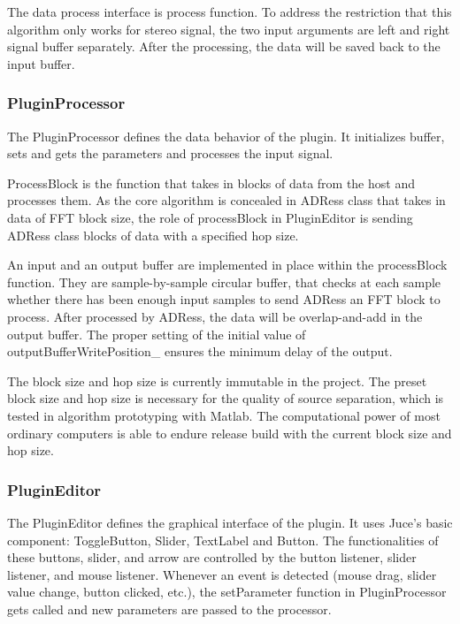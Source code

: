 \documentclass{sig-alternate}
\begin{document}
The data process interface is process function. To address the restriction that this algorithm only works for stereo signal, the two input arguments are left and right signal buffer separately. After the processing, the data will be saved back to the input buffer.

\subsubsection{PluginProcessor}

The PluginProcessor defines the data behavior of the plugin. It initializes buffer, sets and gets the parameters and processes the input signal. 
     
ProcessBlock is the function that takes in blocks of data from the host and processes them. As the core algorithm is concealed in ADRess class that takes in data of FFT block size, the role of processBlock in PluginEditor is sending ADRess class blocks of data with a specified hop size.
     
An input and an output buffer are implemented in place within the processBlock function. They are sample-by-sample circular buffer, that checks at each sample whether there has been enough input samples to send ADRess an FFT block to process. After processed by ADRess, the data will be overlap-and-add in the output buffer. The proper setting of the initial value of outputBufferWritePosition\_ ensures the minimum delay of the output.

The block size and hop size is currently immutable in the project. The preset block size and hop size is necessary for the quality of source separation, which is tested in algorithm prototyping with Matlab. The computational power of most ordinary computers is able to endure release build with the current block size and hop size.

\subsubsection{PluginEditor}

The PluginEditor defines the graphical interface of the plugin. It uses Juce’s basic component:  ToggleButton, Slider, TextLabel and Button. The functionalities of these buttons, slider, and arrow are controlled by the button listener, slider listener, and mouse listener. Whenever an event is detected (mouse drag, slider value change, button clicked, etc.), the setParameter function in PluginProcessor gets called and new parameters are passed to the processor. 
\end{document}
